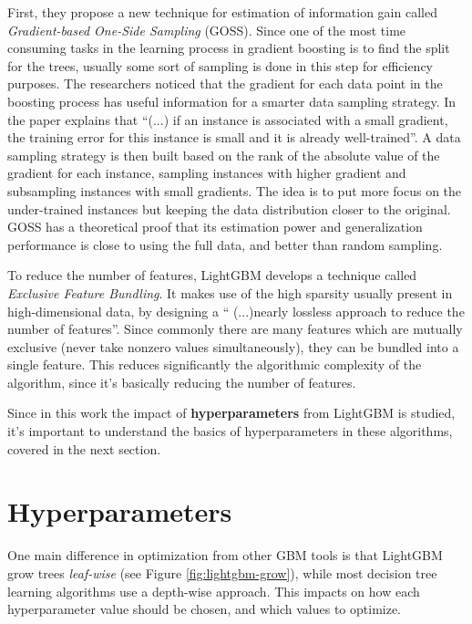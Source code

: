 First, they propose a new technique for estimation of information gain called \textit{Gradient-based One-Side Sampling} (GOSS). Since one of the most time consuming tasks in the learning process in gradient boosting is to find the split for the trees, usually some sort of sampling is done in this step for efficiency purposes. The researchers noticed that the gradient for each data point in the boosting process has useful information for a smarter data sampling strategy. In the paper \cite{ke2017lightgbm} explains that ``(...) if an instance is associated with a small gradient, the training error for this instance is small and it is already well-trained''. A data sampling strategy is then built based on the rank of the absolute value of the gradient for each instance, sampling instances with higher gradient and subsampling instances with small gradients. The idea is to put more focus on the under-trained instances but keeping the data distribution closer to the original. GOSS has a theoretical proof that its estimation power and generalization performance is close to using the full data, and better than random sampling.

To reduce the number of features, LightGBM develops a technique called \textit{Exclusive Feature Bundling}. It makes use of the high sparsity usually present in high-dimensional data, by designing a `` (...)nearly lossless approach to reduce the number of features''. Since commonly there are many features which are mutually exclusive (never take nonzero values simultaneously), they can be bundled into a single feature. This reduces significantly the algorithmic complexity of the algorithm, since it's basically reducing the number of features. 

Since in this work the impact of \textbf{hyperparameters} from LightGBM is studied, it's important to understand the basics of hyperparameters in these algorithms, covered in the next section.

\section{Hyperparameters}
\label{gbm-hyperparams}

One main difference in optimization from other GBM tools is that LightGBM grow trees \textit{leaf-wise} (see Figure \ref{fig:lightgbm-grow}), while most decision tree learning algorithms use a depth-wise approach. This impacts on how each hyperparameter value should be chosen, and which values to optimize. 

